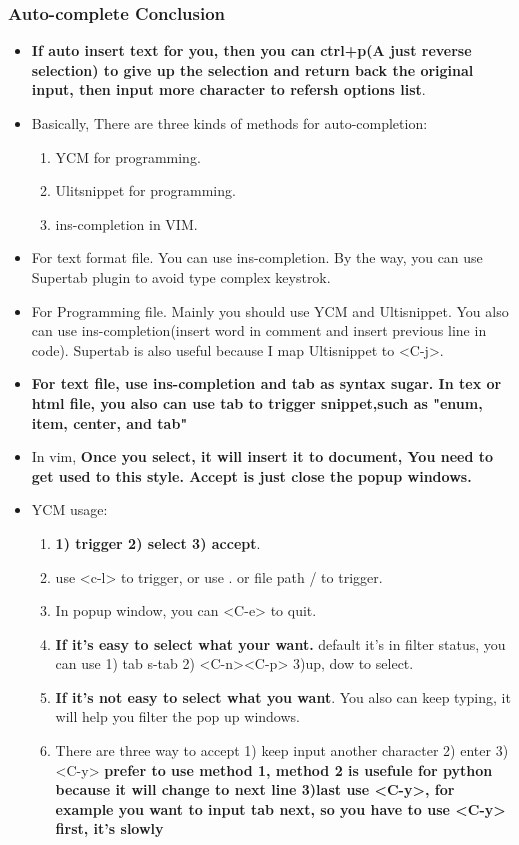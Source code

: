 \documentclass[a4paper,11pt,twoside]{book}
\begin{document}
\subsubsection{Auto-complete Conclusion}

\begin{itemize}
        \item \textbf{If auto insert text for you, then you can ctrl+p(A just reverse selection) to give up the selection and return back the original input, then input more character to refersh options list}.

		\item Basically, There are three kinds of methods for auto-completion:  
				\begin{enumerate}
						\item YCM for programming.
						\item Ulitsnippet for programming.
						\item ins-completion in VIM.
				\end{enumerate}
		\item For text format file. You can use ins-completion. By the way, you can use Supertab plugin to avoid type complex keystrok. 

		\item For Programming file. Mainly you should use YCM and Ultisnippet. You also can use ins-completion(insert word in comment and insert previous line in code). Supertab is also useful because I map Ultisnippet to <C-j>.

		\item \textbf{For text file, use ins-completion and tab as syntax sugar. In tex or html file, you also can use tab to trigger snippet,such as "enum, item, center, and tab"}

		\item In vim, \textbf{Once you select, it will insert it to document, You need to get used to this style. Accept is just close the popup windows.}

		\item YCM usage:
				\begin{enumerate}
						\item \textbf{1) trigger 2) select 3) accept}.
						\item use <c-l> to trigger, or use . or file path / to trigger.
						\item In popup window, you can <C-e> to quit.
						\item \textbf{If it's easy to select what your want.} default it's in filter status, you can use 1) tab s-tab 2) <C-n><C-p> 3)up, dow to select.
						\item \textbf{If it's not easy to select what you want}. You also can keep typing, it will help you filter the pop up windows.
						\item There are three way to accept 1) keep input another character 2) enter 3) <C-y> \textbf{prefer to use method 1, method 2 is usefule for python because it will change to next line 3)last use <C-y>, for example you want to input tab next, so you have to use <C-y> first, it's slowly}
				\end{enumerate}


\end{itemize}
\end{document}
